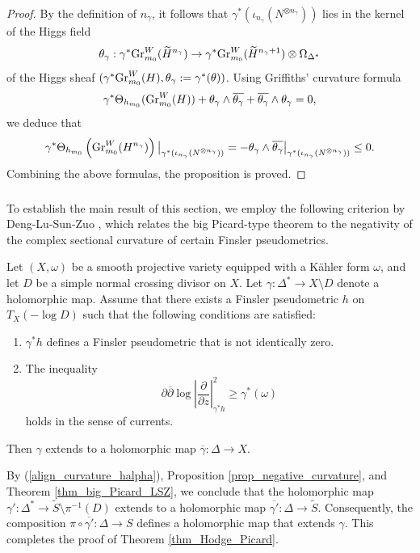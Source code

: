 \documentclass[11pt,letterpaper]{amsart}
\numberwithin{equation}{section}
\begin{document}
\begin{proof}
		By the definition of $n_\gamma$, it follows that $\gamma^\ast(\iota_{n_\gamma}(N^{\otimes n_\gamma}))$ lies in the kernel of the Higgs field  
		$$  
		\theta_\gamma: \gamma^\ast {\rm Gr}^W_{m_0}(\widetilde{H}^{n_\gamma}) \to \gamma^\ast {\rm Gr}^W_{m_0}(\widetilde{H}^{n_\gamma+1}) \otimes \Omega_{\Delta^\ast}  
		$$  
		of the Higgs sheaf $(\gamma^\ast{\rm Gr}^W_{m_0}(H), \theta_\gamma := \gamma^\ast(\theta))$.  		
		Using Griffiths' curvature formula  
		$$  
		\gamma^\ast \Theta_{h_{m_0}}({\rm Gr}^W_{m_0}(H)) + \theta_\gamma \wedge \overline{\theta_\gamma} + \overline{\theta_\gamma} \wedge \theta_\gamma = 0,  
		$$  
		we deduce that  
		$$  
		\gamma^\ast \Theta_{h_{m_0}}\left({\rm Gr}^W_{m_0}(H^{n_\gamma})\right)\big|_{\gamma^\ast(\iota_{n_\gamma}(N^{\otimes n_\gamma}))} = -\theta_\gamma \wedge \overline{\theta_\gamma}\big|_{\gamma^\ast(\iota_{n_\gamma}(N^{\otimes n_\gamma}))} \leq 0.  
		$$  		
		Combining the above formulas, the proposition is proved.  
	\end{proof}
	\subsubsection{}
	To establish the main result of this section, we employ the following criterion by Deng-Lu-Sun-Zuo \cite{DLSZ}, which relates the big Picard-type theorem to the negativity of the complex sectional curvature of certain Finsler pseudometrics.    
	\begin{thm}{\cite[Theorem A]{DLSZ}}\label{thm_big_Picard_LSZ}  
		Let $(X, \omega)$ be a smooth projective variety equipped with a K\"ahler form $\omega$, and let $D$ be a simple normal crossing divisor on $X$. Let $\gamma: \Delta^\ast \to X \setminus D$ denote a holomorphic map. Assume that there exists a Finsler pseudometric $h$ on $T_X(-\log D)$ such that the following conditions are satisfied:  
		\begin{enumerate}  
			\item $\gamma^\ast h$ defines a Finsler pseudometric that is not identically zero.  
			\item The inequality  
			$$  
			\partial\overline{\partial} \log \left| \frac{\partial}{\partial z} \right|^2_{\gamma^\ast h} \geq \gamma^\ast(\omega)  
			$$  
			holds in the sense of currents.  
		\end{enumerate}  
		Then $\gamma$ extends to a holomorphic map $\overline{\gamma}: \Delta \to X$.  
	\end{thm}
	By (\ref{align_curvature_halpha}), Proposition \ref{prop_negative_curvature}, and Theorem \ref{thm_big_Picard_LSZ}, we conclude that the holomorphic map $\gamma': \Delta^\ast \to \widetilde{S} \setminus \pi^{-1}(D)$ extends to a holomorphic map $\overline{\gamma'}: \Delta \to \widetilde{S}$. Consequently, the composition $\pi \circ \overline{\gamma'}: \Delta \to S$ defines a holomorphic map that extends $\gamma$. This completes the proof of Theorem \ref{thm_Hodge_Picard}.
\end{document}
